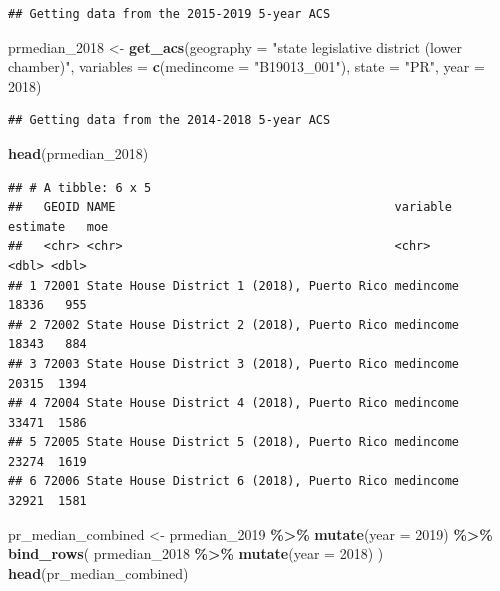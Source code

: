 \documentclass[
]{article}
\newenvironment{Shaded}{\begin{snugshade}}{\end{snugshade}}
\newcommand{\AttributeTok}[1]{\textcolor[rgb]{0.13,0.29,0.53}{#1}}
\newcommand{\DecValTok}[1]{\textcolor[rgb]{0.00,0.00,0.81}{#1}}
\newcommand{\FunctionTok}[1]{\textcolor[rgb]{0.13,0.29,0.53}{\textbf{#1}}}
\newcommand{\NormalTok}[1]{#1}
\newcommand{\OtherTok}[1]{\textcolor[rgb]{0.56,0.35,0.01}{#1}}
\newcommand{\SpecialCharTok}[1]{\textcolor[rgb]{0.81,0.36,0.00}{\textbf{#1}}}
\newcommand{\StringTok}[1]{\textcolor[rgb]{0.31,0.60,0.02}{#1}}
\begin{document}
\begin{verbatim}
## Getting data from the 2015-2019 5-year ACS
\end{verbatim}

\begin{Shaded}
\begin{Highlighting}[]
\NormalTok{prmedian\_2018 }\OtherTok{\textless{}{-}} \FunctionTok{get\_acs}\NormalTok{(}\AttributeTok{geography =} \StringTok{"state legislative district (lower chamber)"}\NormalTok{, }
                    \AttributeTok{variables =} \FunctionTok{c}\NormalTok{(}\AttributeTok{medincome =} \StringTok{"B19013\_001"}\NormalTok{), }
                    \AttributeTok{state =} \StringTok{"PR"}\NormalTok{, }
                    \AttributeTok{year =} \DecValTok{2018}\NormalTok{)}
\end{Highlighting}
\end{Shaded}

\begin{verbatim}
## Getting data from the 2014-2018 5-year ACS
\end{verbatim}

\begin{Shaded}
\begin{Highlighting}[]
\FunctionTok{head}\NormalTok{(prmedian\_2018)}
\end{Highlighting}
\end{Shaded}

\begin{verbatim}
## # A tibble: 6 x 5
##   GEOID NAME                                       variable  estimate   moe
##   <chr> <chr>                                      <chr>        <dbl> <dbl>
## 1 72001 State House District 1 (2018), Puerto Rico medincome    18336   955
## 2 72002 State House District 2 (2018), Puerto Rico medincome    18343   884
## 3 72003 State House District 3 (2018), Puerto Rico medincome    20315  1394
## 4 72004 State House District 4 (2018), Puerto Rico medincome    33471  1586
## 5 72005 State House District 5 (2018), Puerto Rico medincome    23274  1619
## 6 72006 State House District 6 (2018), Puerto Rico medincome    32921  1581
\end{verbatim}

\begin{Shaded}
\begin{Highlighting}[]
\NormalTok{pr\_median\_combined }\OtherTok{\textless{}{-}}\NormalTok{ prmedian\_2019 }\SpecialCharTok{\%\textgreater{}\%}
  \FunctionTok{mutate}\NormalTok{(}\AttributeTok{year =} \DecValTok{2019}\NormalTok{) }\SpecialCharTok{\%\textgreater{}\%}
  \FunctionTok{bind\_rows}\NormalTok{(}
\NormalTok{    prmedian\_2018 }\SpecialCharTok{\%\textgreater{}\%} \FunctionTok{mutate}\NormalTok{(}\AttributeTok{year =} \DecValTok{2018}\NormalTok{)}
\NormalTok{  )}
\FunctionTok{head}\NormalTok{(pr\_median\_combined)}
\end{Highlighting}
\end{Shaded}
\end{document}
